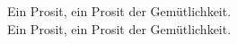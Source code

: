 
            Ein Prosit, ein Prosit der Gemütlichkeit. \\
            Ein Prosit, ein Prosit der Gemütlichkeit. \\
